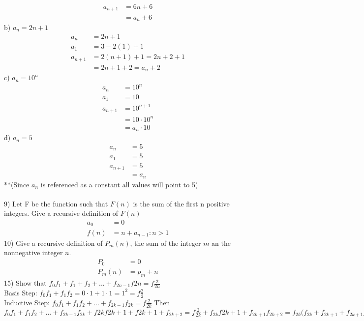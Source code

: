 \documentclass{article}
\begin{document}
\begin{flushleft}
\begin{align*}
a_{n+1} &= 6n + 6 \\ 
&= a_n + 6
\end{align*}
\setlength\parindent{24pt}b) $a_n = 2n + 1$
\begin{align*}
a_{n} &= 2n + 1 \\
a_1 &= 3  - 2(1) + 1\\
a_{n+1} &= 2(n+1) + 1 = 2n + 2 + 1 \\
&= 2n + 1 + 2 = a_n + 2 
\end{align*}
\setlength\parindent{24pt}c) $a_n = 10^n$
\begin{align*}
a_n &= 10^n \\
a_1 &= 10 \\
a_{n+1} &= 10^{n+1} \\
&= 10 \cdot 10^n \\
&= a_n \cdot 10 
\end{align*}
\setlength\parindent{24pt}d) $a_n = 5$ 
\begin{align*}
a_n &= 5 \\
a_1 &= 5 \\
a_{n+1} &= 5  \\
&= a_n 
\end{align*}
**(Since $a_n$ is referenced as a constant all values will point to 5) \\
~\\
\setlength\parindent{0pt}9) Let F be the function such that $F(n)$ is the sum of the first n positive integers.  Give a recursive definition of $F(n)$
\begin{align*}
a_0 &= 0 \\
f(n) &= n + a_{n-1} : n > 1
\end{align*}
\setlength\parindent{0pt}10) Give a recursive definition of $P_m(n)$, the sum of the integer $m$ an the nonnegative integer $n$. 
\begin{align*}
P_0 &= 0 \\
P_m(n) &= p_m + n
\end{align*}
\setlength\parindent{0pt}15) Show that $f_0f_1 + f_1+f_2+... +f_{2n-1}f{2n} = f\frac{2}{2n}$ \\
Basis Step: $f_0f_1+f_1f_2 = 0 \cdot 1 + 1 \cdot 1 = 1^2 = f\frac{2}{2}$ \\
Inductive Step: $f_0f_1 + f_1f_2 + ... + f_{2k-1}f_{2k} = f\frac{2}{2k}$ Then $f_0f_1 + f_1f_2 + ... + f_{2k-1}f_{2k} + f{2k}f{2k+1} + f{2k+1} + f_{2k+2} = f\frac{2}{2k}+ f_{2k}f{2k+1} + f_{2k+1}f_{2k+2} = f_{2k}(f_{2k} + f_{2k+1} + f_{2k+1}f_{2k+2} = f_{2k}f_{2k+2}+f_{2k+1}f_{2k+2} = (f_{2k} + f_{2k+1})f_{2k+2} = f\frac{2}{2k+2}$ 

\end{flushleft}
\end{document}
